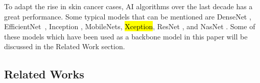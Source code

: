 \documentclass[sensors,article,accept,pdftex,moreauthors]{Definitions/mdpi}
\begin{document}
	To adapt the rise in skin cancer cases, AI algorithms over the last decade has a great performance. Some typical models that can be mentioned are DenseNet \cite{06993}, EfficientNet~\cite{04861}, Inception \cite{00567}\hl{\mbox{\cite{07261}}}, MobileNets\cite{04861,04381,02244}, \hl{Xception\mbox{\cite{02357}}}, ResNet \cite{03385,05027}, and NasNet \cite{07012}. Some of these models which have been used as a backbone model in this paper will be discussed in the Related Work section.
	
	\subsection{Related Works}
		
		
		
\end{document}
